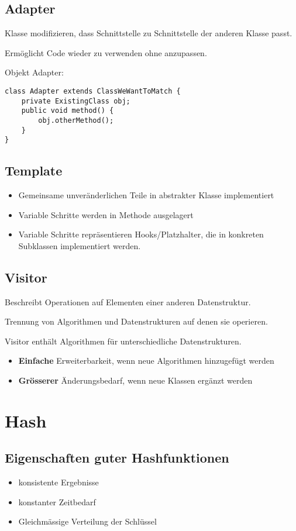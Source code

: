 \begin{multicols*}{5}
	\subsection{Adapter}
	Klasse modifizieren, dass Schnittstelle zu Schnittstelle der anderen Klasse passt.
	
	Ermöglicht Code wieder zu verwenden ohne anzupassen.
	
	Objekt Adapter:
	\begin{lstlisting}
class Adapter extends ClassWeWantToMatch {
	private ExistingClass obj;
	public void method() {
		obj.otherMethod();
	}
}
	\end{lstlisting}

	\subsection{Template}
	\begin{itemize}
		\item Gemeinsame unveränderlichen Teile in abstrakter Klasse implementiert
		\item Variable Schritte werden in Methode ausgelagert
		\item Variable Schritte repräsentieren Hooks/Platzhalter, die in konkreten Subklassen implementiert werden.
	\end{itemize}

	\subsection{Visitor}
	Beschreibt Operationen auf Elementen einer anderen Datenstruktur.
	
	Trennung von Algorithmen und Datenstrukturen auf denen sie operieren. 
	
	Visitor enthält Algorithmen für unterschiedliche Datenstrukturen.
	\begin{itemize}
		\item \textbf{Einfache} Erweiterbarkeit, wenn neue Algorithmen hinzugefügt werden
		\item \textbf{Grösserer} Änderungsbedarf, wenn neue Klassen ergänzt werden
	\end{itemize}

\section{Hash}

	\subsection{Eigenschaften guter Hashfunktionen}
	\begin{itemize}
		\item konsistente Ergebnisse
		\item konstanter Zeitbedarf
		\item Gleichmässige Verteilung der Schlüssel
	\end{itemize}


\end{multicols*}
